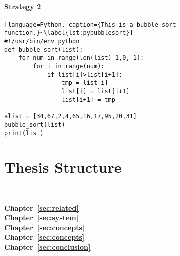 \paragraph{Strategy 2}


\begin{lstlisting}[language=Python, caption={This is a bubble sort function.}~\label{lst:pybubblesort}]
#!/usr/bin/env python
def bubble_sort(list):
    for num in range(len(list)-1,0,-1):
        for i in range(num):
            if list[i]>list[i+1]:
                tmp = list[i]
                list[i] = list[i+1]
                list[i+1] = tmp

alist = [34,67,2,4,65,16,17,95,20,31]
bubble_sort(list)
print(list)
\end{lstlisting}

\section{Thesis Structure}
~\label{sec:intro:structure}

\textbf{Chapter~\ref{sec:related}} \\[0.2em]


\textbf{Chapter~\ref{sec:system}} \\[0.2em]


\textbf{Chapter~\ref{sec:concepts}} \\[0.2em]


\textbf{Chapter~\ref{sec:concepts}} \\[0.2em]


\textbf{Chapter~\ref{sec:conclusion}} \\[0.2em]

